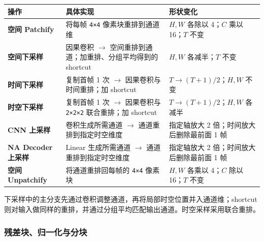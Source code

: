 \documentclass[
  11pt,
  a4paper,
  fontset=none]{ctexart}
\newcounter{none} %
\begin{document}
{\def\LTcaptype{none} %
\begin{longtable}[]{@{}
  >{\raggedright\arraybackslash}p{}
  >{\raggedright\arraybackslash}p{}
  >{\raggedright\arraybackslash}p{}@{}}
\toprule\noalign{}
\begin{minipage}[b]{\linewidth}\raggedright
操作
\end{minipage} & \begin{minipage}[b]{\linewidth}\raggedright
具体实现
\end{minipage} & \begin{minipage}[b]{\linewidth}\raggedright
形状变化
\end{minipage} \\
\midrule\noalign{}
\endhead
\bottomrule\noalign{}
\endlastfoot
\textbf{空间 Patchify} & 将每帧 \texttt{4×4} 像素块重排到通道维 &
\(H,W\) 各除以 4；\(C\) 乘以 16；\(T\) 不变 \\
\textbf{空间下采样} & 因果卷积 \(\rightarrow\)
空间重排到通道；加重排、分组平均得到的 shortcut & \(H,W\) 各减半；\(T\)
不变 \\
\textbf{时间下采样} & 复制首帧 1 次 \(\rightarrow\)
因果卷积与时间重排；加 shortcut & \(T\rightarrow(T+1)/2\)；\(H,W\)
不变 \\
\textbf{时空下采样} & 复制首帧 1 次 \(\rightarrow\) 因果卷积与
\texttt{2×2×2} 联合重排；加 shortcut & \(T\rightarrow(T+1)/2\)；\(H,W\)
各减半 \\
\textbf{CNN 上采样} & 卷积生成所需通道 \(\rightarrow\)
通道重排到指定时空维度 & 指定轴放大 2 倍；时间放大后删除最前面 1 帧 \\
\textbf{NA Decoder 上采样} & Linear 生成所需通道 \(\rightarrow\)
通道重排到指定时空维度 & 指定轴放大 2 倍；时间放大后删除最前面 1 帧 \\
\textbf{空间 Unpatchify} & 将通道重排回每帧的 \texttt{4×4} 像素块 &
\(H,W\) 各乘以 4；\(C\) 除以 16；\(T\) 不变 \\
\end{longtable}
}

\endgroup

下采样中的主分支先通过卷积调整通道，再将局部时空位置并入通道维；shortcut
则对输入做同样的重排，并通过分组平均匹配输出通道。时空采样采用联合重排。


\subsubsection{残差块、归一化与分块}\label{ux6b8bux5deeux5757ux5f52ux4e00ux5316ux4e0eux5206ux5757}
\end{document}

